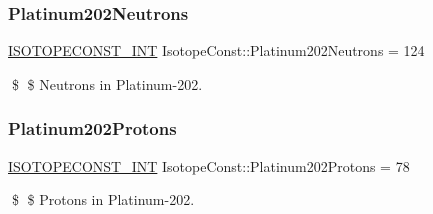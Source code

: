 \subsubsection{\texorpdfstring{Platinum202\+Neutrons}{Platinum202Neutrons}}
{\footnotesize\ttfamily \mbox{\hyperlink{group___isotope_const-_macros_ga5f18360b3e99483a35c32d789e62621c}{I\+S\+O\+T\+O\+P\+E\+C\+O\+N\+S\+T\+\_\+\+I\+NT}} Isotope\+Const\+::\+Platinum202\+Neutrons = 124}

\$ \$ Neutrons in Platinum-\/202. \mbox{\label{group___isotope_const-_platinum-_pt202_gae58034d004f3c0c96984cd44e0684632}} 
\subsubsection{\texorpdfstring{Platinum202\+Protons}{Platinum202Protons}}
{\footnotesize\ttfamily \mbox{\hyperlink{group___isotope_const-_macros_ga5f18360b3e99483a35c32d789e62621c}{I\+S\+O\+T\+O\+P\+E\+C\+O\+N\+S\+T\+\_\+\+I\+NT}} Isotope\+Const\+::\+Platinum202\+Protons = 78}

\$ \$ Protons in Platinum-\/202. 